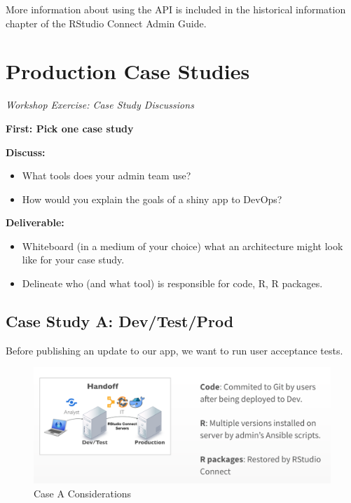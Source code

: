 \documentclass[]{book}
\providecommand{\tightlist}{%
  \setlength{\itemsep}{0pt}\setlength{\parskip}{0pt}}
\theoremstyle{definition}
\theoremstyle{definition}
\theoremstyle{definition}
\theoremstyle{remark}
\begin{document}
More information about using the API is included in the historical
information chapter of the RStudio Connect Admin Guide.

\hypertarget{production-case-studies}{%
\chapter{Production Case Studies}\label{production-case-studies}}

\emph{Workshop Exercise: Case Study Discussions}

\textbf{First: Pick one case study}

\textbf{Discuss:}

\begin{itemize}
\tightlist
\item
  What tools does your admin team use?
\item
  How would you explain the goals of a shiny app to DevOps?
\end{itemize}

\textbf{Deliverable:}

\begin{itemize}
\tightlist
\item
  Whiteboard (in a medium of your choice) what an architecture might
  look like for your case study.
\item
  Delineate who (and what tool) is responsible for code, R, R packages.
\end{itemize}

\hypertarget{case-study-a-devtestprod}{%
\section{Case Study A: Dev/Test/Prod}\label{case-study-a-devtestprod}}

Before publishing an update to our app, we want to run user acceptance
tests.

\begin{figure}
\centering
\includegraphics{imgs/case-studies/case-a.png}
\caption{Case A Considerations}
\end{figure}
\end{document}
